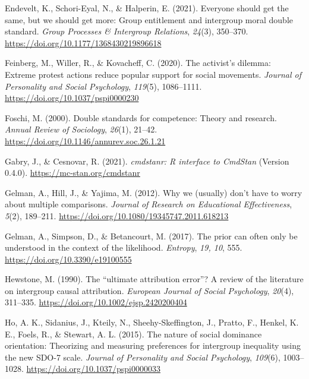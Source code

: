 \documentclass[twocolumn, 11pt, letterpaper]{article}
\newenvironment{CSLReferences}[2]{}{}
\begin{document}
\begin{CSLReferences}{1}{0}
\leavevmode{}%
Endevelt, K., Schori-Eyal, N., \& Halperin, E. (2021). Everyone should
get the same, but we should get more: Group entitlement and intergroup
moral double standard. \emph{Group Processes \& Intergroup Relations},
\emph{24}(3), 350--370. \url{https://doi.org/10.1177/1368430219896618}

\leavevmode{}%
Feinberg, M., Willer, R., \& Kovacheff, C. (2020). The activist's
dilemma: {Extreme} protest actions reduce popular support for social
movements. \emph{Journal of Personality and Social Psychology},
\emph{119}(5), 1086--1111. \url{https://doi.org/10.1037/pspi0000230}

\leavevmode{}%
Foschi, M. (2000). Double standards for competence: Theory and research.
\emph{Annual Review of Sociology}, \emph{26}(1), 21--42.
\url{https://doi.org/10.1146/annurev.soc.26.1.21}

\leavevmode{}%
Gabry, J., \& Cesnovar, R. (2021). \emph{{cmdstanr}: {R} interface to
{CmdStan}} (Version 0.4.0). \url{https://mc-stan.org/cmdstanr}

\leavevmode{}%
Gelman, A., Hill, J., \& Yajima, M. (2012). Why we (usually) don't have
to worry about multiple comparisons. \emph{Journal of Research on
Educational Effectiveness}, \emph{5}(2), 189--211.
\url{https://doi.org/10.1080/19345747.2011.618213}

\leavevmode{}%
Gelman, A., Simpson, D., \& Betancourt, M. (2017). The prior can often
only be understood in the context of the likelihood. \emph{Entropy},
\emph{19, 10}, 555. \url{https://doi.org/10.3390/e19100555}

\leavevmode{}%
Hewstone, M. (1990). The {``ultimate attribution error''}? {A} review of
the literature on intergroup causal attribution. \emph{European Journal
of Social Psychology}, \emph{20}(4), 311--335.
\url{https://doi.org/10.1002/ejsp.2420200404}

\leavevmode{}%
Ho, A. K., Sidanius, J., Kteily, N., Sheehy-Skeffington, J., Pratto, F.,
Henkel, K. E., Foels, R., \& Stewart, A. L. (2015). The nature of social
dominance orientation: {Theorizing} and measuring preferences for
intergroup inequality using the new {SDO}-7 scale. \emph{Journal of
Personality and Social Psychology}, \emph{109}(6), 1003--1028.
\url{https://doi.org/10.1037/pspi0000033}


\end{CSLReferences}
\end{document}
